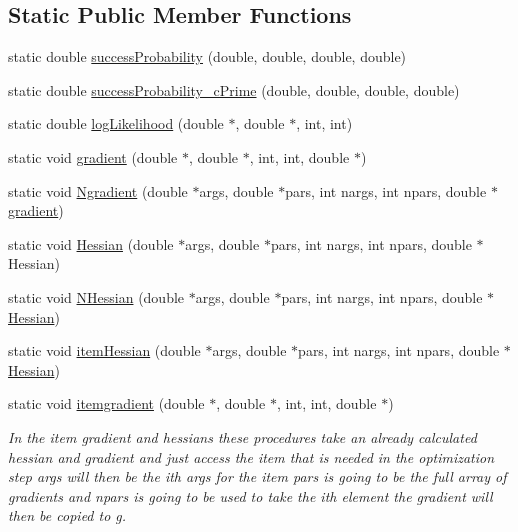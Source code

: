 \subsection*{Static Public Member Functions}
\begin{DoxyCompactItemize}
\item 
static double \hyperlink{classThreePLModel_a4ac3badc7d7a17b57be43d24bfb924e3}{success\+Probability} (double, double, double, double)
\item 
static double \hyperlink{classThreePLModel_a89d3c2a8f9d077e48db38f78aa8d3526}{success\+Probability\+\_\+c\+Prime} (double, double, double, double)
\item 
static double \hyperlink{classThreePLModel_ae31380f753f4bc118788f9dbc93fe4af}{log\+Likelihood} (double $\ast$, double $\ast$, int, int)
\item 
static void \hyperlink{classThreePLModel_a6b86ab6fe2c11047723864ab95bd29da}{gradient} (double $\ast$, double $\ast$, int, int, double $\ast$)
\item 
static void \hyperlink{classThreePLModel_ae24fa3d2b9bf02b79a010ea760f1bff4}{Ngradient} (double $\ast$args, double $\ast$pars, int nargs, int npars, double $\ast$\hyperlink{classThreePLModel_a6b86ab6fe2c11047723864ab95bd29da}{gradient})
\item 
static void \hyperlink{classThreePLModel_a034561892349c03922d857a67d15f79d}{Hessian} (double $\ast$args, double $\ast$pars, int nargs, int npars, double $\ast$Hessian)
\item 
static void \hyperlink{classThreePLModel_acc5f243d6863cf431df88b4b1648e52d}{N\+Hessian} (double $\ast$args, double $\ast$pars, int nargs, int npars, double $\ast$\hyperlink{classThreePLModel_a034561892349c03922d857a67d15f79d}{Hessian})
\item 
static void \hyperlink{classThreePLModel_a4eb5d27957e207af988cfc87b1adbb27}{item\+Hessian} (double $\ast$args, double $\ast$pars, int nargs, int npars, double $\ast$\hyperlink{classThreePLModel_a034561892349c03922d857a67d15f79d}{Hessian})
\item 
static void \hyperlink{classThreePLModel_a1e103a8afde4c931b15d451f131ebc6e}{itemgradient} (double $\ast$, double $\ast$, int, int, double $\ast$)
\begin{DoxyCompactList}\small\item\em In the item gradient and hessians these procedures take an already calculated hessian and gradient and just access the item that is needed in the optimization step args will then be the ith args for the item pars is going to be the full array of gradients and npars is going to be used to take the ith element the gradient will then be copied to g. \end{DoxyCompactList}\end{DoxyCompactItemize}
